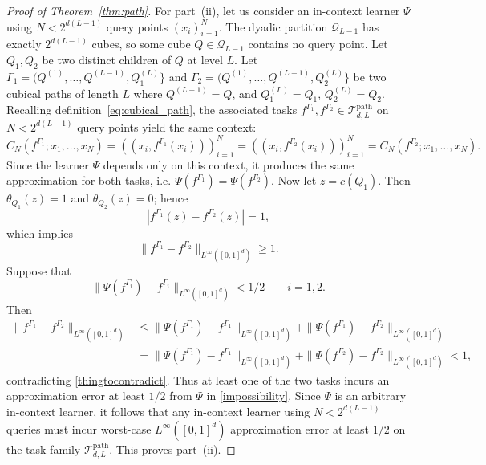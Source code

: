 \documentclass{article}
\begin{document}
\begin{proof}[Proof of Theorem~\ref{thm:path}]
For part~(ii), let us consider %
an in-context learner $\Psi$ using $N<2^{d(L-1)}$ query points $(x_i)_{i=1}^N$.
The dyadic partition $\mathcal Q_{L-1}$ has exactly $2^{d(L-1)}$ cubes, so some cube $Q\in\mathcal Q_{L-1}$ contains no query point. 
Let $Q_1,Q_2$ be two distinct children of $Q$ at level $L$.
Let $\Gamma_1 = (Q^{(1)},\dots,Q^{(L-1)}, Q^{(L)}_1\}$ and $\Gamma_2 = (Q^{(1)},\dots,Q^{(L-1)}, Q^{(L)}_2\}$ be two cubical paths of length $L$ where $Q^{(L-1)}=Q$, and $Q^{(L)}_1=Q_1$, $Q^{(L)}_2=Q_2$.
Recalling definition~\eqref{eq:cubical_path}, the associated tasks $f^{\Gamma_1}, f^{\Gamma_2}\in \mathcal{T}_{d,L}^{\mathrm{path}}$ on $N<2^{d(L-1)}$ query points yield the same context:
\begin{equation*}
    C_N(f^{\Gamma_1};x_1,\dots,x_N) = ((x_i,f^{\Gamma_1}(x_i)))_{i=1}^N
    = ((x_i,f^{\Gamma_2}(x_i)))_{i=1}^N =C_N(f^{\Gamma_2};x_1,\dots,x_N).
\end{equation*}
Since the learner $\Psi$ depends only on this context, it produces the same approximation for both tasks, i.e. $\Psi(f^{\Gamma_1})=\Psi(f^{\Gamma_2})$.
Now let $z=c(Q_1)$. Then $\theta_{Q_1}(z)=1$ and $\theta_{Q_2}(z)=0$; hence %
\[
|f^{\Gamma_1}(z)-f^{\Gamma_2}(z)|=1,
\]
which implies
\begin{equation} \label{thingtocontradict}
    \|f^{\Gamma_1}-f^{\Gamma_2}\|_{L^\infty([0,1]^d)}\ge 1.
\end{equation}
Suppose that
\begin{equation} \label{impossibility}
    \|\Psi(f^{\Gamma_i})-f^{\Gamma_i}\|_{L^\infty([0,1]^d)} < 1/2 \qquad i=1,2.
\end{equation}
Then 
\begin{align*}
    \|f^{\Gamma_1}-f^{\Gamma_2}\|_{L^\infty([0,1]^d)} &\leq \|\Psi(f^{\Gamma_1})-f^{\Gamma_1}\|_{L^\infty([0,1]^d)} + \|\Psi(f^{\Gamma_1})-f^{\Gamma_2}\|_{L^\infty([0,1]^d)} \\
    &= \|\Psi(f^{\Gamma_1})-f^{\Gamma_1}\|_{L^\infty([0,1]^d)} + \|\Psi(f^{\Gamma_2})-f^{\Gamma_2}\|_{L^\infty([0,1]^d)} < 1,
\end{align*}
contradicting \eqref{thingtocontradict}.
Thus at least one of the two tasks incurs an approximation error at least $1/2$ from $\Psi$ in \eqref{impossibility}. 
Since $\Psi$ is an arbitrary in-context learner, it follows that any in-context learner using $N<2^{d(L-1)}$ queries must incur worst-case $L^\infty([0,1]^d)$ approximation error at least $1/2$ on the task family $\mathcal{T}_{d,L}^{\mathrm{path}}$. This proves part~(ii).


\end{proof}
\end{document}
